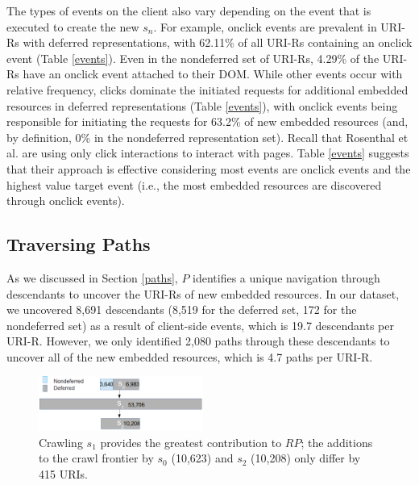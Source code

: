 \documentclass{sig-alternate}
\begin{document}
The types of events on the client also vary depending on the event that is executed to create the new $s_n$. For example, onclick events are prevalent in URI-Rs with deferred representations, with 62.11\% of all URI-Rs containing an onclick event (Table \ref{events}). Even in the nondeferred set of URI-Rs, 4.29\% of the URI-Rs have an onclick event attached to their DOM. While other events occur with relative frequency, clicks dominate the initiated requests for additional embedded resources in deferred representations (Table \ref{events}), with onclick events being responsible for initiating the requests for 63.2\% of new embedded resources (and, by definition, 0\% in the nondeferred representation set). Recall that Rosenthal et al. are using only click interactions to interact with pages. Table \ref{events} suggests that their approach is effective considering most events are onclick events and the highest value target event (i.e., the most embedded resources are discovered through onclick events). 


\subsection{Traversing Paths}
\label{traversingPaths}
As we discussed in Section \ref{paths}, $P$ identifies a unique navigation through descendants to uncover the URI-Rs of new embedded resources. In our dataset, we uncovered 8,691 descendants (8,519 for the deferred set, 172 for the nondeferred set) as a result of client-side events, which is 19.7 descendants per URI-R. However, we only identified 2,080 paths through these descendants to uncover all of the new embedded resources, which is 4.7 paths per URI-R. 


\begin{figure}
\centering
\includegraphics[width=0.48\textwidth]{./imgs/tree_diagram.png}
\caption{Crawling $s_1$ provides the greatest contribution to $RP$; the additions to the crawl frontier by $s_0$ (10,623) and $s_2$ (10,208) only differ by 415 URIs.}
\label{growth2a}
\end{figure}
\end{document}

